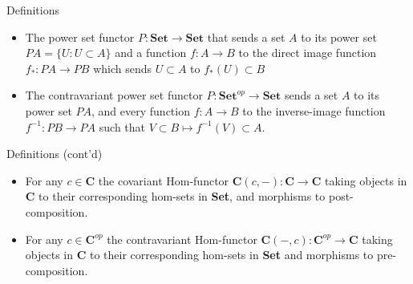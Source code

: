\documentclass[tikz]{beamer}
\theoremstyle{definition}
\begin{document}
\begin{frame}{Definitions}

    \begin{itemize}
        \item The power set functor $P: \mathbf{Set} \to \mathbf{Set}$ that sends a set $A$ to its power set $PA = \{U : U \subset A\}$ and a function $f: A \to B$ to the direct image function $f_* : PA \to PB$ which sends $U \subset A$ to $f_*(U) \subset B$
        
        \item The contravariant power set functor $P: \mathbf{Set}^{op} \to \mathbf{Set}$ sends a set $A$ to its power set $PA$, and every function $f: A \to B$ to the inverse-image function $f^{-1}: PB \to PA$ such that $V \subset B \mapsto f^{-1}(V) \subset A$.
    \end{itemize}{}
\end{frame}{}

\begin{frame}{Definitions (cont'd)}

\begin{itemize}
    \item For any $c \in \mathbf{C}$ the covariant Hom-functor $\mathbf{C}(c, -): \mathbf{C} \to \mathbf{C}$ taking objects in $\mathbf{C}$ to their corresponding hom-sets in \textbf{Set}, and morphisms to post-composition.
    \item For any $c \in \mathbf{C}^{op}$ the contravariant Hom-functor $\mathbf{C}(-, c): \mathbf{C}^{op} \to \mathbf{C}$ taking objects in $\mathbf{C}$ to their corresponding hom-sets in \textbf{Set} and morphisms to pre-composition. 
\end{itemize}{}
\end{frame}{}
\end{document}
